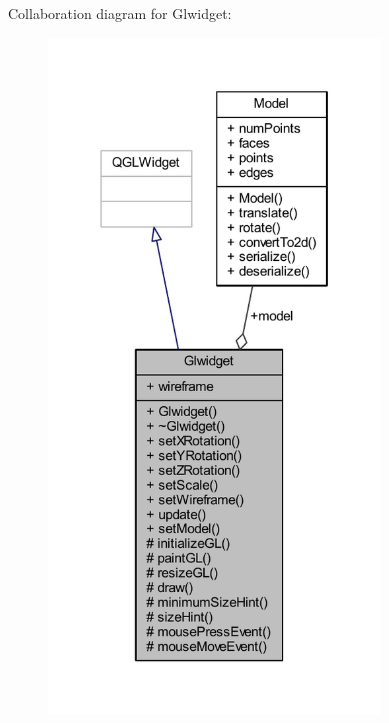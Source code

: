 Collaboration diagram for Glwidget\+:
\nopagebreak
\begin{figure}[H]
\begin{center}
\leavevmode
\includegraphics[width=250pt]{class_glwidget__coll__graph}
\end{center}
\end{figure}
